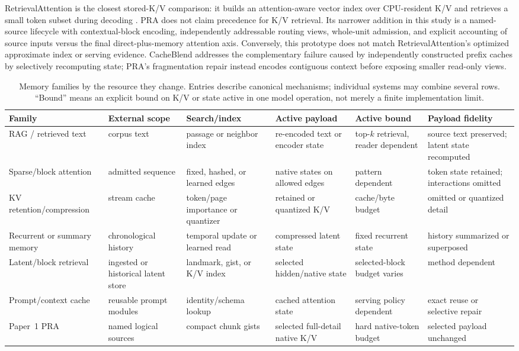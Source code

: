\documentclass[11pt]{article}
\begin{document}
RetrievalAttention is the closest stored-K/V comparison: it builds an attention-aware vector
index over CPU-resident K/V and retrieves a small token subset during decoding
\cite{liu2024retrievalattention}. PRA does not claim precedence for K/V retrieval. Its narrower
addition in this study is a named-source lifecycle with contextual-block encoding, independently
addressable routing views, whole-unit admission, and explicit accounting of source inputs versus
the final direct-plus-memory attention axis. Conversely, this prototype does not match
RetrievalAttention's optimized approximate index or serving evidence. CacheBlend addresses the
complementary failure caused by independently constructed prefix caches by selectively
recomputing state; PRA's fragmentation repair instead encodes contiguous context before exposing
smaller read-only views.

\begin{table}[H]
\centering
\scriptsize
\setlength{\tabcolsep}{3pt}
\renewcommand{\arraystretch}{1.03}
\caption{Memory families by the resource they change. Entries describe canonical mechanisms;
individual systems may combine several rows. ``Bound'' means an explicit bound on K/V or state
active in one model operation, not merely a finite implementation limit.}
\label{tab:related-resource-taxonomy}
\begin{tabularx}{\textwidth}{P{0.14\textwidth}P{0.14\textwidth}P{0.14\textwidth}P{0.16\textwidth}P{0.11\textwidth}Y}
\toprule
Family & External scope & Search/index & Active payload & Active bound & Payload fidelity \\
\midrule
RAG / retrieved text & corpus text & passage or neighbor index & re-encoded text or encoder state & top-$k$ retrieval, reader dependent & source text preserved; latent state recomputed \\
Sparse/block attention & admitted sequence & fixed, hashed, or learned edges & native states on allowed edges & pattern dependent & token state retained; interactions omitted \\
KV retention/compression & stream cache & token/page importance or quantizer & retained or quantized K/V & cache/byte budget & omitted or quantized detail \\
Recurrent or summary memory & chronological history & temporal update or learned read & compressed latent state & fixed recurrent state & history summarized or superposed \\
Latent/block retrieval & ingested or historical latent store & landmark, gist, or K/V index & selected hidden/native state & selected-block budget varies & method dependent \\
Prompt/context cache & reusable prompt modules & identity/schema lookup & cached attention state & serving policy dependent & exact reuse or selective repair \\
Paper~1 PRA & named logical sources & compact chunk gists & selected full-detail native K/V & hard native-token budget & selected payload unchanged \\
\bottomrule
\end{tabularx}
\end{table}
\end{document}
